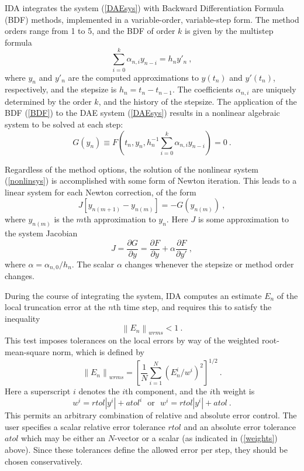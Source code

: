 \documentclass[11pt]{article}
\begin{document}
IDA integrates the system (\ref{DAEsys}) with Backward Differentiation
Formula (BDF) methods, implemented in a variable-order, variable-step
form.  The method orders range from 1 to 5, and the BDF of order $k$
is given by the multistep formula
\begin{equation}
\sum_{i=0}^k \alpha_{n,i}y_{n-i} = h_n y'_n ~,  \label{BDF}
\end{equation}
where $y_n$ and $y'_n$ are the computed approximations to $y(t_n)$
and $y'(t_n)$, respectively, and the stepsize is $h_n = t_n - t_{n-1}$.  
The coefficients $\alpha_{n,i}$ are uniquely determined by the order
$k$, and the history of the stepsize.  The application of the BDF
(\ref{BDF}) to the DAE system (\ref{DAEsys}) results in a nonlinear
algebraic system to be solved at each step:
\begin{equation}
G(y_n) \equiv F(t_n, y_n, h_n^{-1} \sum_{i=0}^k \alpha_{n,i}y_{n-i})
       = 0 ~.                                         \label{nonlinsys}
\end{equation}

Regardless of the method options, the solution of the nonlinear system
(\ref{nonlinsys}) is accomplished with some form of Newton iteration.
This leads to a linear system for each Newton correction, of the form
\begin{equation}
J [y_{n(m+1)} - y_{n(m)}] = -G(y_{n(m)})  ~, \label{Newtoncorr}
\end{equation}
where $y_{n(m)}$ is the $m$th approximation to $y_n$.  Here $J$ is 
some approximation to the system Jacobian
\begin{equation}
J = \frac{\partial G}{\partial y}
  = \frac{\partial F}{\partial y} + \alpha\frac{\partial F}{\partial y'}
                                                     ~, \label{sysjac}
\end{equation}
where $\alpha = \alpha_{n,0}/h_n$.  The scalar $\alpha$ changes 
whenever the stepsize or method order changes.

During the course of integrating the system, IDA computes an estimate
$E_n$ of the local truncation error at the $n$th time step, and
requires this to satisfy the inequality
\begin{equation}
  \left\| E_n\right\|_{wrms} < 1 ~.                  \label{Errtest}
\end{equation}
This test imposes tolerances on the local errors by way of the weighted
root-mean-square norm, which is defined by
\[
\left\| E_n\right\|_{wrms} = \left[ \frac{1}{N} \sum_{i=1}^N 
    ( E_n^i / w^i ) ^2 \right] ^{1/2} ~.
\]
Here a superscript $i$ denotes the $i$th component, and the $i$th
weight is 
\begin{equation}
w^i = rtol |y^i| + atol^i ~~~ \mbox{or} ~~~ w^i = rtol |y^i| + atol ~.
                                                    \label{weights}
\end{equation}
This permits an arbitrary combination of relative and absolute error
control. The user specifies a scalar relative error tolerance $rtol$
and an absolute error tolerance $atol$ which may be either an
$N$-vector or a scalar (as indicated in (\ref{weights}) above).  
Since these tolerances define the allowed error per step, they should
be chosen conservatively.
\end{document}
